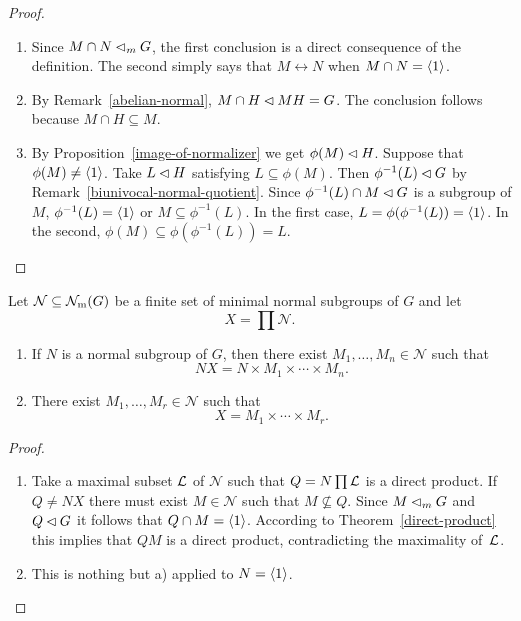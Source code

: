 \begin{proof}${}$
\begin{enumerate}[\rm a)]
    \item Since $M\cap N\lhd_mG$, the first conclusion is a direct consequence of the definition. The second simply says that $M\leftrightarrow N$ when $M\cap N=\langle1\rangle$.

    \item By Remark~\ref{abelian-normal}, $M\cap H\lhd MH=G$. The conclusion follows because $M\cap H\subseteq M$.

    \item By Proposition~\ref{image-of-normalizer} we get $\phi(M)\lhd H$. Suppose that $\phi(M)\ne\langle1\rangle$. Take $L\lhd H$ satisfying $L\subseteq\phi(M)$. Then $\phi^{-1}(L)\lhd G$ by Remark~\ref{biunivocal-normal-quotient}. Since $\phi^{-1}(L)\cap M\lhd G$ is a subgroup of $M$, $\phi^{-1}(L)=\langle1\rangle$ or $M\subseteq\phi^{-1}(L)$. In the first case, $L=\phi(\phi^{-1}(L))=\langle1\rangle$. In the second, $\phi(M)\subseteq\phi(\phi^{-1}(L))=L$.
\end{enumerate}
\end{proof}

\begin{thm}\label{product-of-minimal-normal}
    Let\/ $\mathcal N\subseteq\operatorname{{\cal N}_m}(G)$ be a finite set of minimal normal subgroups of\/ $G$ and let
    $$
        X = \prod\mathcal N.
    $$
    \begin{enumerate}[\rm a)]
    \item If\/ $N$ is a normal subgroup of\/ $G$, then there exist\/ $M_1, \dots, M_n \in\mathcal N$ such that
    $$
        NX = N \times M_1 \times \cdots \times M_n.
    $$
    \item There exist\/ $M_1, \ldots, M_r \in\mathcal N$ such that
    $$
        X = M_1 \times \cdots \times M_r.
    $$
    \end{enumerate}
\end{thm}

\begin{proof}${}$
\begin{enumerate}[\rm a)]
    \item Take a maximal subset $\cal L$ of $\mathcal N$ such that $Q=N\prod\cal L$ is a direct product. If $Q\ne NX$ there must exist $M\in\mathcal N$ such that $M\not\subseteq Q$. Since $M\lhd_mG$ and $Q\lhd G$ it follows that $Q\cap M=\langle1\rangle$. According to Theorem~\ref{direct-product} this implies that $QM$ is a direct product, contradicting the maximality of~$\cal L$.

    \item This is nothing but a) applied to $N=\langle1\rangle$.
\end{enumerate}
\end{proof}


